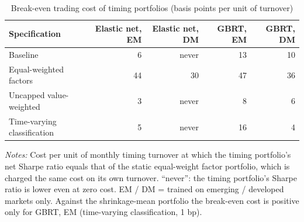 \begin{table}[!ht]
\centering\small
\caption{Break-even trading cost of timing portfolios (basis points per unit of turnover)}
\label{tab:breakeven}
\begin{tabular}{lrrrr}
\toprule
Specification & Elastic net, EM & Elastic net, DM & GBRT, EM & GBRT, DM \\
\midrule
Baseline & 6 & never & 13 & 10 \\
Equal-weighted factors & 44 & 30 & 47 & 36 \\
Uncapped value-weighted & 3 & never & 8 & 6 \\
Time-varying classification & 5 & never & 16 & 4 \\
\bottomrule
\end{tabular}

\vspace{4pt}
\begin{minipage}{0.95\linewidth}\footnotesize
\textit{Notes:} Cost per unit of monthly timing turnover at which the timing portfolio's net Sharpe ratio equals that of the static equal-weight factor portfolio, which is charged the same cost on its own turnover. ``never'': the timing portfolio's Sharpe ratio is lower even at zero cost. EM / DM = trained on emerging / developed markets only. Against the shrinkage-mean portfolio the break-even cost is positive only for GBRT, EM (time-varying classification, 1 bp).
\end{minipage}
\end{table}
